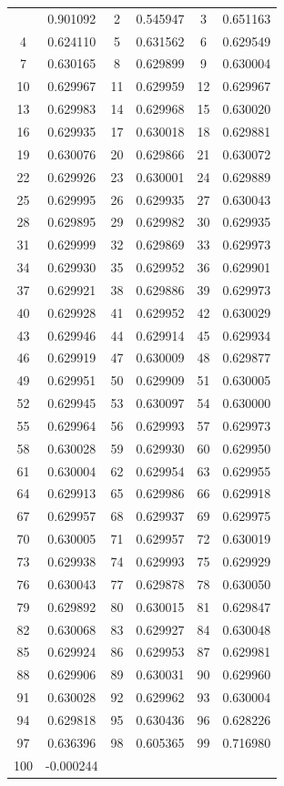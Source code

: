 \documentclass[12pt]{article}
\begin{document}
\begin{longtable}{@{}cc|cc|cc@{}}
\bottomrule
\endlastfoot
1 & 0.901092 & 2 & 0.545947 & 3 & 0.651163 \\
4 & 0.624110 & 5 & 0.631562 & 6 & 0.629549 \\
7 & 0.630165 & 8 & 0.629899 & 9 & 0.630004 \\
10 & 0.629967 & 11 & 0.629959 & 12 & 0.629967 \\
13 & 0.629983 & 14 & 0.629968 & 15 & 0.630020 \\
16 & 0.629935 & 17 & 0.630018 & 18 & 0.629881 \\
19 & 0.630076 & 20 & 0.629866 & 21 & 0.630072 \\
22 & 0.629926 & 23 & 0.630001 & 24 & 0.629889 \\
25 & 0.629995 & 26 & 0.629935 & 27 & 0.630043 \\
28 & 0.629895 & 29 & 0.629982 & 30 & 0.629935 \\
31 & 0.629999 & 32 & 0.629869 & 33 & 0.629973 \\
34 & 0.629930 & 35 & 0.629952 & 36 & 0.629901 \\
37 & 0.629921 & 38 & 0.629886 & 39 & 0.629973 \\
40 & 0.629928 & 41 & 0.629952 & 42 & 0.630029 \\
43 & 0.629946 & 44 & 0.629914 & 45 & 0.629934 \\
46 & 0.629919 & 47 & 0.630009 & 48 & 0.629877 \\
49 & 0.629951 & 50 & 0.629909 & 51 & 0.630005 \\
52 & 0.629945 & 53 & 0.630097 & 54 & 0.630000 \\
55 & 0.629964 & 56 & 0.629993 & 57 & 0.629973 \\
58 & 0.630028 & 59 & 0.629930 & 60 & 0.629950 \\
61 & 0.630004 & 62 & 0.629954 & 63 & 0.629955 \\
64 & 0.629913 & 65 & 0.629986 & 66 & 0.629918 \\
67 & 0.629957 & 68 & 0.629937 & 69 & 0.629975 \\
70 & 0.630005 & 71 & 0.629957 & 72 & 0.630019 \\
73 & 0.629938 & 74 & 0.629993 & 75 & 0.629929 \\
76 & 0.630043 & 77 & 0.629878 & 78 & 0.630050 \\
79 & 0.629892 & 80 & 0.630015 & 81 & 0.629847 \\
82 & 0.630068 & 83 & 0.629927 & 84 & 0.630048 \\
85 & 0.629924 & 86 & 0.629953 & 87 & 0.629981 \\
88 & 0.629906 & 89 & 0.630031 & 90 & 0.629960 \\
91 & 0.630028 & 92 & 0.629962 & 93 & 0.630004 \\
94 & 0.629818 & 95 & 0.630436 & 96 & 0.628226 \\
97 & 0.636396 & 98 & 0.605365 & 99 & 0.716980 \\
100 & -0.000244 &  &  &  &  \\

\end{longtable}
\end{document}
